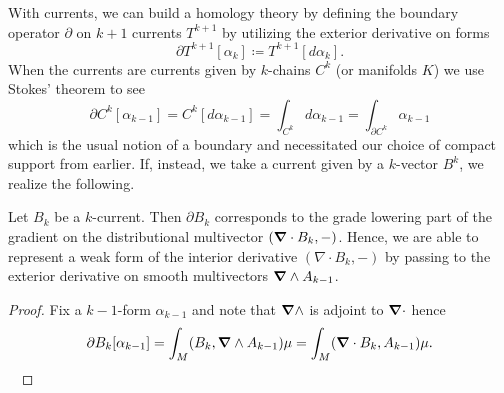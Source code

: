 \documentclass{article}
\begin{document}
With currents, we can build a homology theory \cite{iversen_cauchy_1989} by defining the boundary operator $\partial$ on $k+1$ currents $T^{k+1}$ by utilizing the exterior derivative on forms 
\begin{equation}
\partial T^{k+1}[\alpha_k] \coloneqq T^{k+1}[d\alpha_k].
\end{equation}
When the currents are currents given by $k$-chains $C^k$ (or manifolds $K$) we use Stokes' theorem to see
\begin{equation}
\label{eq:stokes}
\partial C^k[\alpha_{k-1}] = C^k[d\alpha_{k-1}] = \int_{C^k} d\alpha_{k-1} = \int_{\partial C^k} \alpha_{k-1}
\end{equation}
which is the usual notion of a boundary and necessitated our choice of compact support from earlier. If, instead, we take a current given by a $k$-vector $B^k$, we realize the following.
\begin{proposition}
\label{prop:grad_dot}
    Let $B_k$ be a $k$-current. Then $\partial B_k$ corresponds to the grade lowering part of the gradient on the distributional multivector $(\boldsymbol{\nabla} \cdot B_k,-)$. Hence, we are able to represent a weak form of the interior derivative $(\nabla \cdot B_k,-)$ by passing to the exterior derivative on smooth multivectors $\boldsymbol{\nabla} \wedge A_{k-1}$.
\end{proposition}
\begin{proof}
Fix a $k-1$-form $\alpha_{k-1}$ and note that $\boldsymbol{\nabla} \wedge$ is adjoint to $\boldsymbol{\nabla} \cdot$ hence
\begin{align}
    \partial B_k[\alpha_{k-1}]=  \int_M(B_k,\boldsymbol{\nabla} \wedge A_{k-1})\mu = \int_M(\boldsymbol{\nabla} \cdot B_k, A_{k-1}) \mu.
\end{align}\
\end{proof}
\end{document}
